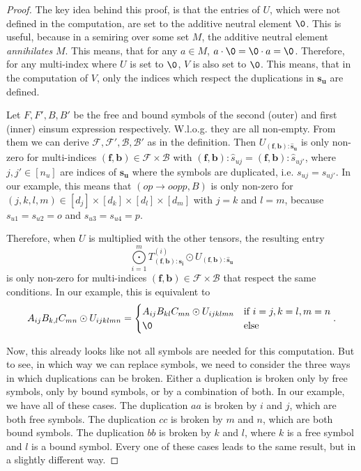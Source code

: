 \begin{proof}
    \small
    The key idea behind this proof, is that the entries of $U$, which were not defined in the computation, are set to the additive neutral element $\0$.
    This is useful, because in a semiring over some set $M$, the additive neutral element \textit{annihilates} $M$.
    This means, that for any $a \in M$, $a \cdot \0 = \0 \cdot a = \0$.
    Therefore, for any multi-index where $U$ is set to $\0$, $V$ is also set to $\0$.
    This means, that in the computation of $V$, only the indices which respect the duplications in $\bm{s_u}$ are defined.

    Let $F, F', B, B'$ be the free and bound symbols of the second (outer) and first (inner) einsum expression respectively.
    W.l.o.g. they are all non-empty.
    From them we can derive $\mathcal{F}, \mathcal{F}', \mathcal{B}, \mathcal{B}'$ as in the definition.
    Then $U_{(\bm{f}, \bm{b}): \bm{\hat{s}_u}}$ is only non-zero for multi-indices $(\bm{f}, \bm{b}) \in \mathcal{F} \times \mathcal{B}$ with $(\bm{f}, \bm{b}):\hat{s}_{uj} = (\bm{f}, \bm{b}):\hat{s}_{uj'}$, where $j,j' \in [n_u]$ are indices of $\bm{s_u}$ where the symbols are duplicated, i.e. $s_{uj} = s_{uj'}$.
    In our example, this means that $(op \rightarrow oopp, B)$ is only non-zero for $(j,k,l,m) \in [d_j] \times [d_k] \times [d_l] \times [d_m]$ with $j = k$ and $l = m$, because $s_{u1} = s_{u2} = o$ and $s_{u3} = s_{u4} = p$.

    Therefore, when $U$ is multiplied with the other tensors, the resulting entry
    $$\bigodot\limits_{i = 1}^{m} T^{(i)}_{(\bm{f}, \bm{b}): \bm{s_i}} \odot U_{(\bm{f}, \bm{b}): \bm{\hat{s}_u}}$$
    is only non-zero for multi-indices $(\bm{f}, \bm{b}) \in \mathcal{F} \times \mathcal{B}$ that respect the same conditions.
    In our example, this is equivalent to
    $$A_{ij} B_{k,l} C_{mn} \odot U_{ijklmn} = \begin{cases}
            A_{ij} B_{kl} C_{mn} \odot U_{ijklmn} & \text{if } i = j, k = l, m = n \\
            \0                                    & \text{else}
        \end{cases}.$$

    Now, this already looks like not all symbols are needed for this computation.
    But to see, in which way we can replace symbols, we need to consider the three ways in which duplications can be broken.
    Either a duplication is broken only by free symbols, only by bound symbols, or by a combination of both.
    In our example, we have all of these cases.
    The duplication $aa$ is broken by $i$ and $j$, which are both free symbols.
    The duplication $cc$ is broken by $m$ and $n$, which are both bound symbols.
    The duplication $bb$ is broken by $k$ and $l$, where $k$ is a free symbol and $l$ is a bound symbol.
    Every one of these cases leads to the same result, but in a slightly different way.


\end{proof}

